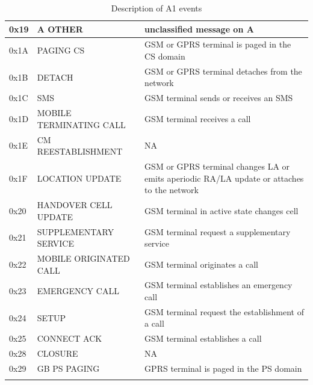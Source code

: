 {\begin{longtable}{|l|p{4cm}|p{8cm}|}
		0x19         & A OTHER                              & unclassified message on A                                                                                  \\ \hline
		0x1A         & PAGING CS                            & GSM or GPRS terminal is paged in the CS domain                                                             \\ \hline
		0x1B         & DETACH                               & GSM or GPRS terminal detaches from the network                                                             \\ \hline
		0x1C         & SMS                                  & GSM terminal sends or receives an SMS                                                                      \\ \hline
		0x1D         & MOBILE TERMINATING CALL              & GSM terminal receives a call                                                                               \\ \hline
		0x1E         & CM REESTABLISHMENT                   & NA                                                                                                         \\ \hline
		0x1F         & LOCATION UPDATE                      & GSM or GPRS terminal changes LA or emits aperiodic RA/LA update or attaches to the network                 \\ \hline
		0x20         & HANDOVER CELL UPDATE                 & GSM terminal in active state changes cell                                                                  \\ \hline
		0x21         & SUPPLEMENTARY SERVICE                & GSM terminal request a supplementary service                                                               \\ \hline
		0x22         & MOBILE ORIGINATED CALL               & GSM terminal originates a call                                                                             \\ \hline
		0x23         & EMERGENCY CALL                       & GSM terminal establishes an emergency call                                                                 \\ \hline
		0x24         & SETUP                                & GSM terminal request the establishment of a call                                                           \\ \hline
		0x25         & CONNECT ACK                          & GSM terminal establishes a call                                                                            \\ \hline
		0x28         & CLOSURE                              & NA                                                                                                         \\ \hline
		0x29         & GB PS PAGING                         & GPRS terminal is paged in the PS domain                                                                    \\ \hline
		\caption{Description of A1 events}
		\label{tab:eventtype}
	\end{longtable}}
